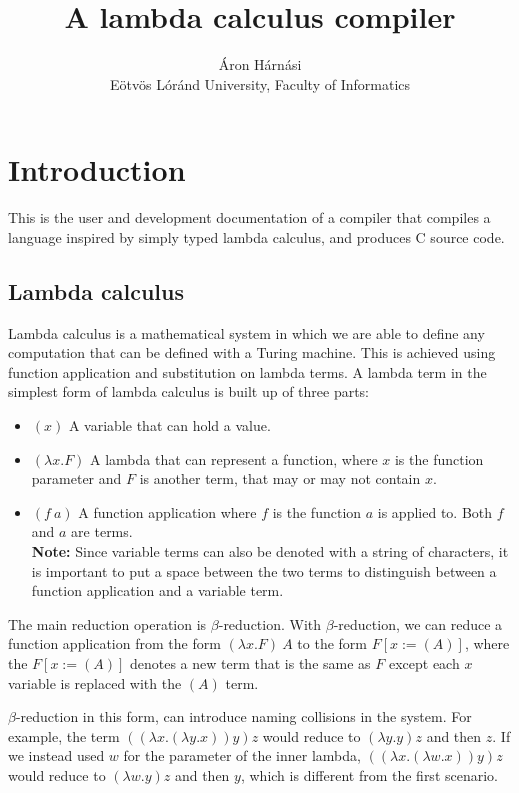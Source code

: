 \documentclass[12pt]{article}
\title{A lambda calculus compiler}
\author{Áron Hárnási \\ \normalsize Eötvös Lóránd University, Faculty of Informatics}
\begin{document}
\linespread{1}
\maketitle
\pagebreak
\tableofcontents
\pagebreak

\section{Introduction}

This is the user and development documentation of a compiler that compiles a
language inspired by simply typed lambda calculus, and produces C source code.

\subsection{Lambda calculus}

Lambda calculus is a mathematical system in which we are able to define any
computation that can be defined with a Turing machine. This is achieved using
function application and substitution on lambda terms. A lambda term in the
simplest form of lambda calculus is built up of three parts:
\begin{itemize}
    \item $(x)$ A variable that can hold a value.
    \item $(\lambda x. F)$ A lambda that can represent a function, where $x$
        is the function parameter and $F$ is another term, that may or 
        may not contain $x$.
    \item $(f\:a)$ A function application where $f$ is the function $a$ is
        applied to. Both $f$ and $a$ are terms. \\ \textbf{Note:} Since variable
        terms can also be denoted with a string of characters, it is important
        to put a space between the two terms to distinguish between a function
        application and a variable term.
\end{itemize}
The main reduction operation is $\beta$-reduction. With $\beta$-reduction, we
can reduce a function application from the form $(\lambda x. F)\:A$ to the
form $F[x := (A)]$, where the $F[x := (A)]$ denotes a new term that is the same
as $F$ except each $x$ variable is replaced with the $(A)$ term.

$\beta$-reduction in this form, can introduce naming collisions in the system.
For example, the term $((\lambda x. (\lambda y. x)) y) z$ would reduce to
$(\lambda y. y) z$ and then $z$. If we instead used $w$ for the parameter of the
inner lambda, $((\lambda x. (\lambda w. x)) y) z$ would reduce to $(\lambda w.
y) z$ and then $y$, which is different from the first scenario.
\end{document}
